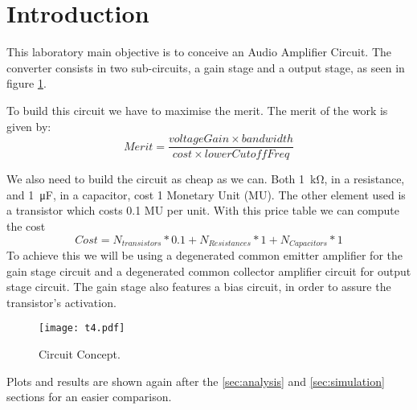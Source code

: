 \section{Introduction}

This laboratory main objective is to conceive an Audio Amplifier Circuit. The converter consists in two sub-circuits, a gain stage and a output stage, as seen in figure \ref{Fig1: circuit}.

To build this circuit we have to maximise the merit. The merit of the work is given by:
\begin{equation}
    Merit = \dfrac{voltageGain \times bandwidth}{cost \times lowerCutoffFreq}
\end{equation}

We also need to build the circuit as cheap as we can. Both \SI{1}{\kilo\ohm}, in a resistance, and \SI{1}{\micro\farad}, in a capacitor, cost 1 Monetary Unit (MU). The other element used is a transistor which costs 0.1 MU per unit.
With this price table we can compute the cost
\begin{equation}
    Cost = N_{transistors}*0.1+N_{Resistances}*1+N_{Capacitors}*1
\end{equation}
To achieve this we will be using a degenerated common emitter amplifier for the gain stage circuit and a degenerated common collector amplifier circuit for output stage circuit. The gain stage also features a bias circuit, in order to assure the transistor's activation.

\begin{figure}[h] 
\centering
\texttt{[image: t4.pdf]}
\caption{Circuit Concept.}
\label{Fig1: circuit}
\end{figure}

Plots and results are shown again after the \ref{sec:analysis} and \ref{sec:simulation} sections for an easier comparison.
